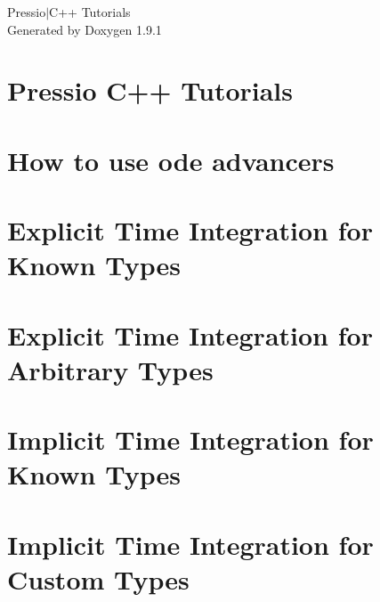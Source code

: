 \let\mypdfximage\pdfximage\def\pdfximage{\immediate\mypdfximage}\documentclass[twoside]{book}
\newcommand{\+}{\discretionary{\mbox{\scriptsize$\hookleftarrow$}}{}{}}
\newcommand{\clearemptydoublepage}{%
  \newpage{\pagestyle{empty}\cleardoublepage}%
}
\begin{document}
\raggedbottom

\hypersetup{pageanchor=false,
             bookmarksnumbered=true,
             pdfencoding=unicode
            }
\begin{titlepage}
\vspace*{7cm}
\begin{center}%
{\Large Pressio$\vert$\+C++ Tutorials }\\
\vspace*{1cm}
{\large Generated by Doxygen 1.9.1}\\
\end{center}
\end{titlepage}
\clearemptydoublepage
{}
\tableofcontents
\clearemptydoublepage
{}
\hypersetup{pageanchor=true}

\chapter{Pressio C++ Tutorials}
\label{index}\hypertarget{index}{}
\chapter{How to use ode advancers}
\label{md_pages_ode_advancers_advancers}

\chapter{Explicit Time Integration for Known Types}
\label{md_pages_ode_steppers_tutorial1}

\chapter{Explicit Time Integration for Arbitrary Types}
\label{md_pages_ode_steppers_tutorial2}

\chapter{Implicit Time Integration for Known Types}
\label{md_pages_ode_steppers_tutorial3}

\chapter{Implicit Time Integration for Custom Types}
\label{md_pages_ode_steppers_tutorial4}

\end{document}
